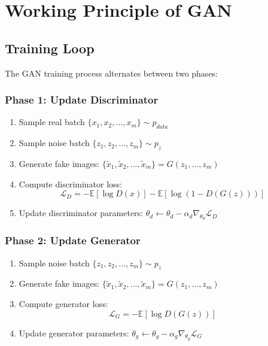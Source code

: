 \documentclass[12pt,a4paper]{article}
\begin{document}
\section{Working Principle of GAN} \label{sec:working}

\subsection{Training Loop}

The GAN training process alternates between two phases:

\subsubsection{Phase 1: Update Discriminator}

\begin{enumerate}
    \item Sample real batch $\{x_1, x_2, \ldots, x_m\} \sim p_{data}$
    \item Sample noise batch $\{z_1, z_2, \ldots, z_m\} \sim p_z$
    \item Generate fake images: $\{\tilde{x}_1, \tilde{x}_2, \ldots, \tilde{x}_m\} = G(z_1, \ldots, z_m)$
    \item Compute discriminator loss:
    \begin{equation}
        \mathcal{L}_D = -\mathbb{E}[\log D(x)] - \mathbb{E}[\log(1 - D(G(z)))]
    \end{equation}
    \item Update discriminator parameters: $\theta_d \leftarrow \theta_d - \alpha_d \nabla_{\theta_d} \mathcal{L}_D$
\end{enumerate}

\subsubsection{Phase 2: Update Generator}

\begin{enumerate}
    \item Sample noise batch $\{z_1, z_2, \ldots, z_m\} \sim p_z$
    \item Generate fake images: $\{\tilde{x}_1, \tilde{x}_2, \ldots, \tilde{x}_m\} = G(z_1, \ldots, z_m)$
    \item Compute generator loss:
    \begin{equation}
        \mathcal{L}_G = -\mathbb{E}[\log D(G(z))]
    \end{equation}
    \item Update generator parameters: $\theta_g \leftarrow \theta_g - \alpha_g \nabla_{\theta_g} \mathcal{L}_G$
\end{enumerate}
\end{document}

